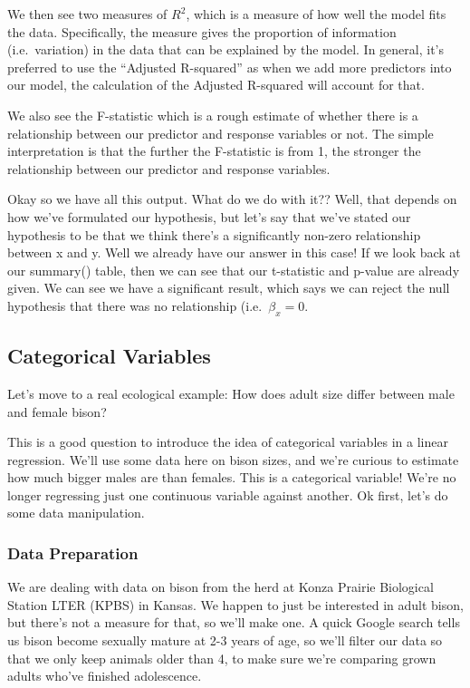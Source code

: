 \documentclass[
]{article}
\begin{document}
We then see two measures of \(R^2\), which is a measure of how well the
model fits the data. Specifically, the measure gives the proportion of
information (i.e.~variation) in the data that can be explained by the
model. In general, it's preferred to use the ``Adjusted R-squared'' as
when we add more predictors into our model, the calculation of the
Adjusted R-squared will account for that.

We also see the F-statistic which is a rough estimate of whether there
is a relationship between our predictor and response variables or not.
The simple interpretation is that the further the F-statistic is from 1,
the stronger the relationship between our predictor and response
variables.

Okay so we have all this output. What do we do with it?? Well, that
depends on how we've formulated our hypothesis, but let's say that we've
stated our hypothesis to be that we think there's a significantly
non-zero relationship between x and y. Well we already have our answer
in this case! If we look back at our summary() table, then we can see
that our t-statistic and p-value are already given. We can see we have a
significant result, which says we can reject the null hypothesis that
there was no relationship (i.e.~\(\beta_x = 0\).

\hypertarget{categorical-variables}{%
\subsection{Categorical Variables}\label{categorical-variables}}

Let's move to a real ecological example: How does adult size differ
between male and female bison?

This is a good question to introduce the idea of categorical variables
in a linear regression. We'll use some data here on bison sizes, and
we're curious to estimate how much bigger males are than females. This
is a categorical variable! We're no longer regressing just one
continuous variable against another. Ok first, let's do some data
manipulation.

\hypertarget{data-preparation}{%
\subsubsection{Data Preparation}\label{data-preparation}}

We are dealing with data on bison from the herd at Konza Prairie
Biological Station LTER (KPBS) in Kansas. We happen to just be
interested in adult bison, but there's not a measure for that, so we'll
make one. A quick Google search tells us bison become sexually mature at
2-3 years of age, so we'll filter our data so that we only keep animals
older than 4, to make sure we're comparing grown adults who've finished
adolescence.
\end{document}

